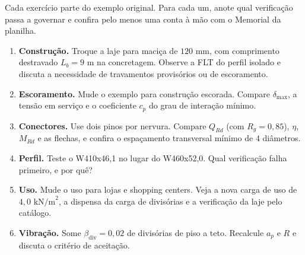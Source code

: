 \documentclass[11pt,a4paper]{article}
\begin{document}
Cada exercício parte do exemplo original. Para cada um, anote qual verificação passa a governar e confira pelo menos uma conta à mão com o Memorial da planilha.
\begin{enumerate}
  \item \textbf{Construção.} Troque a laje para maciça de $120\text{ mm}$, com comprimento destravado $L_b = 9\text{ m}$ na concretagem. Observe a FLT do perfil isolado e discuta a necessidade de travamentos provisórios ou de escoramento.
  \item \textbf{Escoramento.} Mude o exemplo para construção escorada. Compare $\delta_{\max}$, a tensão em serviço e o coeficiente $c_p$ do grau de interação mínimo.
  \item \textbf{Conectores.} Use dois pinos por nervura. Compare $Q_{Rd}$ (com $R_g = 0{,}85$), $\eta$, $M_{Rd}$ e as flechas, e confira o espaçamento transversal mínimo de $4$ diâmetros.
  \item \textbf{Perfil.} Teste o W410x46,1 no lugar do W460x52,0. Qual verificação falha primeiro, e por quê?
  \item \textbf{Uso.} Mude o uso para lojas e shopping centers. Veja a nova carga de uso de $4{,}0\text{ kN/m}^2$, a dispensa da carga de divisórias e a verificação da laje pelo catálogo.
  \item \textbf{Vibração.} Some $\beta_{\text{div}} = 0{,}02$ de divisórias de piso a teto. Recalcule $a_p$ e $R$ e discuta o critério de aceitação.
\end{enumerate}
\end{document}
